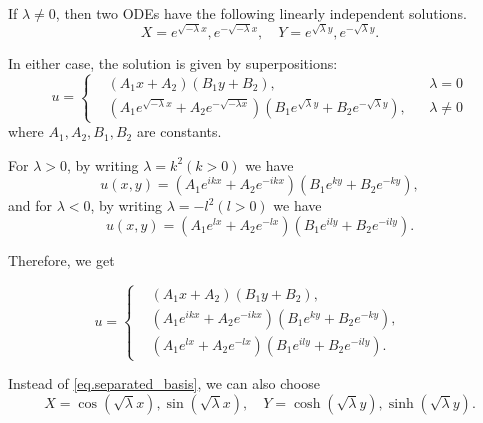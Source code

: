 If $\lambda \neq 0$, then two ODEs have the following linearly independent solutions.
\begin{equation}\label{eq.separated_basis}
X=e^{\sqrt{-\lambda} x}, e^{-\sqrt{-\lambda} x}, \quad Y=e^{\sqrt{\lambda} y}, e^{-\sqrt{\lambda} y} .
\end{equation}

In either case, the solution is given by superpositions:
\begin{equation}\label{eq.basis_separated}
u=
\left\{\begin{aligned}
&\left(A_1 x+A_2\right)\left(B_1 y+B_2\right), && \lambda=0 
\\
&\left(A_1 e^{\sqrt{-\lambda} x}+A_2 e^{-\sqrt{-\lambda x}}\right)\left(B_1 e^{\sqrt{\lambda} y}+B_2 e^{-\sqrt{\lambda} y}\right), && \lambda \neq 0
\end{aligned}\right.
\end{equation}
where $A_1, A_2, B_1, B_2$ are constants. 

For $\lambda>0$, by writing $\lambda=k^2(k>0)$ we have
\begin{equation}\label{eq.basis_+}
u(x, y)=\left(A_1 e^{i k x}+A_2 e^{-i k x}\right)\left(B_1 e^{k y}+B_2 e^{-k y}\right),
\end{equation}
and for $\lambda<0$, by writing $\lambda=-l^2(l>0)$ we have
\begin{equation}\label{eq.basis_-}
u(x, y)=\left(A_1 e^{l x}+A_2 e^{-l x}\right)\left(B_1 e^{i l y}+B_2 e^{-i l y}\right) .
\end{equation}

Therefore, we get 

\begin{equation}\label{eq.basis_separated_+-}
u=
\left\{\begin{aligned}
&\left(A_1 x+A_2\right)\left(B_1 y+B_2\right), && 
\\
&\left(A_1 e^{i k x}+A_2 e^{-i k x}\right)\left(B_1 e^{k y}+B_2 e^{-k y}\right), && 
\\
&\left(A_1 e^{l x}+A_2 e^{-l x}\right)\left(B_1 e^{i l y}+B_2 e^{-i l y}\right).
\end{aligned}\right.
\end{equation}

Instead of \eqref{eq.separated_basis}, we can also choose
\begin{equation}
X=\cos (\sqrt{\lambda} x), \sin (\sqrt{\lambda} x), \quad Y=\cosh (\sqrt{\lambda} y), \sinh (\sqrt{\lambda} y) .
\end{equation}

